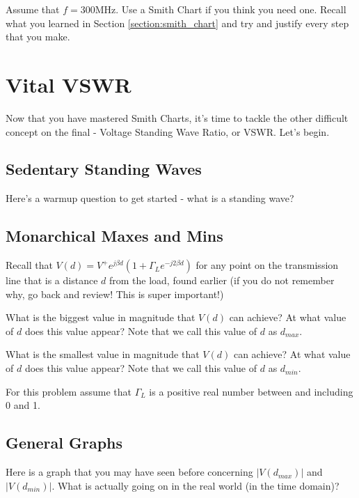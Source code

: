 \documentclass{article}
\begin{document}
Assume that $f = 300$MHz. Use a Smith Chart if you think you need one. Recall what you learned in Section \ref{section:smith_chart} and try and justify every step that you make.
\vfill

\newpage

\section{Vital VSWR}

Now that you have mastered Smith Charts, it's time to tackle the other difficult concept on the final - Voltage Standing Wave Ratio, or VSWR. Let's begin.

\subsection{Sedentary Standing Waves}

Here's a warmup question to get started - what is a standing wave?

\vspace{1cm}

\subsection{Monarchical Maxes and Mins}

Recall that $V(d) = V^+ e^{j \beta d} (1 + \Gamma_L e^{-j2\beta d})$ for any point on the transmission line that is a distance $d$ from the load, found earlier (if you do not remember why, go back and review! This is super important!)

What is the biggest value in magnitude that $V(d)$ can achieve? At what value of $d$ does this value appear? Note that we call this value of $d$ as $d_{max}$.

What is the smallest value in magnitude that $V(d)$ can achieve? At what value of $d$ does this value appear? Note that we call this value of $d$ as $d_{min}$.

For this problem assume that $\Gamma_L$ is a positive real number between and including 0 and 1.

\vspace{3cm}

\subsection{General Graphs}

Here is a graph that you may have seen before concerning $\vert V(d_{max}) \vert$ and $\vert V(d_{min}) \vert$. What is actually going on in the real world (in the time domain)?
\end{document}
